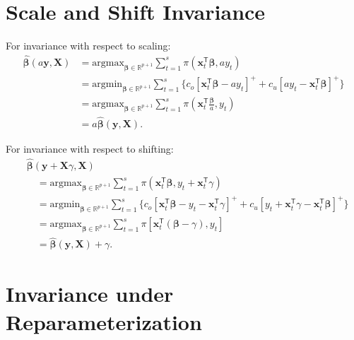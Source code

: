 \documentclass{article}
\begin{document}
\appendix

\section{Scale and Shift Invariance}
\label{app:A}

For invariance with respect to scaling:
\[
    \begin{aligned}
        \hat{\boldsymbol{\beta}}(a\mathbf{y},\mathbf{X})
        &=\text{argmax}_{\boldsymbol{\beta}\in \mathbb{R}^{p+1}}\displaystyle\sum_{t=1}^s{\pi(\mathbf{x}_t^{\mathsf{T}}\boldsymbol{\beta},ay_t)}\\
        &=\text{argmin}_{\boldsymbol{\beta}\in \mathbb{R}^{p+1}}\displaystyle\sum_{t=1}^s{\{c_o[\mathbf{x}_t^{\mathsf{T}}\boldsymbol{\beta}-ay_t]^{+}+c_u[ay_t-\mathbf{x}_t^{\mathsf{T}}\boldsymbol{\beta}]^{+}\}}\\
        &=\text{argmax}_{\boldsymbol{\beta}\in \mathbb{R}^{p+1}}\displaystyle\sum_{t=1}^s{\pi\left(\mathbf{x}_t^{\mathsf{T}}\frac{\boldsymbol{\beta}}{a},y_t\right)}\\
        &=a\hat{\boldsymbol{\beta}}(\mathbf{y},\mathbf{X}).
    \end{aligned}
\]

\noindent
For invariance with respect to shifting:
\[
    \begin{aligned}
        &\hat{\boldsymbol{\beta}}(\mathbf{y}+\mathbf{X}\gamma,\mathbf{X})\\
        &\quad=\text{argmax}_{\boldsymbol{\beta}\in \mathbb{R}^{p+1}}\displaystyle\sum_{t=1}^s{\pi(\mathbf{x}_t^{\mathsf{T}}\boldsymbol{\beta},y_t+\mathbf{x}_t^{\mathsf{T}}\gamma)}\\
        &\quad=\text{argmin}_{\boldsymbol{\beta}\in \mathbb{R}^{p+1}}\displaystyle\sum_{t=1}^s{\{c_o[\mathbf{x}_t^{\mathsf{T}}\boldsymbol{\beta}-y_t-\mathbf{x}_t^{\mathsf{T}}\gamma]^{+}+c_u[y_t+\mathbf{x}_t^{\mathsf{T}}\gamma-\mathbf{x}_t^{\mathsf{T}}\boldsymbol{\beta}]^{+}\}}\\
        &\quad=\text{argmax}_{\boldsymbol{\beta}\in \mathbb{R}^{p+1}}\displaystyle\sum_{t=1}^s{\pi[\mathbf{x}_t^{\mathsf{T}}(\boldsymbol{\beta}-\gamma),y_t]}\\
        &\quad=\hat{\boldsymbol{\beta}}(\mathbf{y},\mathbf{X})+\gamma.
    \end{aligned}
\]

\section{Invariance under Reparameterization}
\label{app:B}
\end{document}
